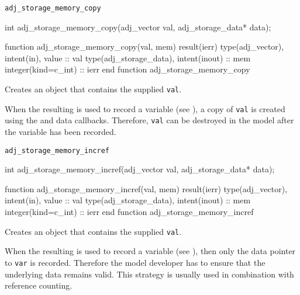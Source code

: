 
\begin{boxwithtitle}{\texttt{adj_storage_memory_copy}}
\begin{minipage}{\columnwidth}
\begin{ccode}
  int adj_storage_memory_copy(adj_vector val, adj_storage_data* data);
\end{ccode}
\begin{fortrancode}
  function adj_storage_memory_copy(val, mem) result(ierr)
    type(adj_vector), intent(in), value :: val
    type(adj_storage_data), intent(inout) :: mem
    integer(kind=c_int) :: ierr
  end function adj_storage_memory_copy
\end{fortrancode}
\end{minipage}
\end{boxwithtitle}

Creates an  object that contains the supplied  \texttt{val}.

When the resulting  is used to record a variable (see ), 
a copy of \texttt{val} is created using the  and  data callbacks.
Therefore, \texttt{val} can be destroyed in the model after the variable has been recorded. 


\begin{boxwithtitle}{\texttt{adj_storage_memory_incref}}
\begin{minipage}{\columnwidth}
\begin{ccode}
  int adj_storage_memory_incref(adj_vector val, adj_storage_data* data);
\end{ccode}
\begin{fortrancode}
  function adj_storage_memory_incref(val, mem) result(ierr)
    type(adj_vector), intent(in), value :: val
    type(adj_storage_data), intent(inout) :: mem
    integer(kind=c_int) :: ierr
  end function adj_storage_memory_incref
\end{fortrancode}
\end{minipage}
\end{boxwithtitle}

Creates an  object that contains the supplied  \texttt{val}.

When the resulting  is used to record a variable (see ), 
then only the data pointer to \texttt{var} is recorded.
Therefore the model developer has to ensure that the underlying data remains valid.
This strategy is usually used in combination with reference counting.


